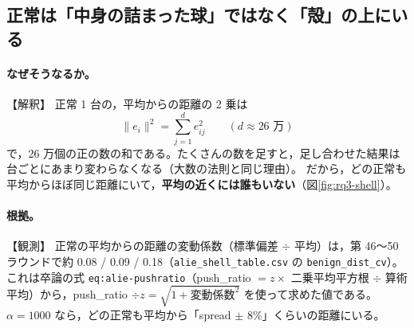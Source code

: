 \documentclass[a4j, dvipdfmx]{jsarticle}  %
\begin{document}
\subsection{正常は「中身の詰まった球」ではなく「殻」の上にいる}
\label{sec:claim-rq3-shell}

\paragraph{なぜそうなるか。}【解釈】
正常 1 台の，平均からの距離の 2 乗は
\begin{equation}
  \|e_i\|^2 = \sum_{j=1}^{d} e_{ij}^2 \qquad (d \approx 26 \text{ 万})
\end{equation}
で，26 万個の正の数の和である。たくさんの数を足すと，足し合わせた結果は台ごとにあまり変わらなくなる（大数の法則と同じ理由）。
だから，どの正常も平均からほぼ同じ距離にいて，\textbf{平均の近くには誰もいない}（図\ref{fig:rq3-shell}）。

\paragraph{根拠。}【観測】
正常の平均からの距離の変動係数（標準偏差 $\div$ 平均）は，第 46〜50 ラウンドで約 0.08 / 0.09 / 0.18（\texttt{alie\_shell\_table.csv} の \texttt{benign\_dist\_cv}）。
これは卒論の式 \texttt{eq:alie-pushratio}（push\_ratio $= z \times$ 二乗平均平方根 $\div$ 算術平均）から，push\_ratio $\div z = \sqrt{1 + \text{変動係数}^2}$ を使って求めた値である。
$\alpha = 1000$ なら，どの正常も平均から「spread $\pm$ 8\%」くらいの距離にいる。
\end{document}

